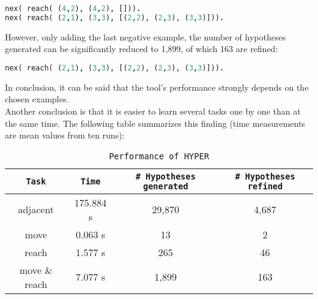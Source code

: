 \begin{lstlisting}[label={lst:comb_neg2}, language=Prolog, caption=Additional example for combined learning of "move" \& "reach", belowcaptionskip=1cm]
nex( reach( (4,2), (4,2), [])).
nex( reach( (2,1), (3,3), [(2,2), (2,3), (3,3)])).
\end{lstlisting}
However, only adding the last negative example, the number of hypotheses generated can be significantly reduced to 1,899, of which 163 are refined:
\begin{lstlisting}[label={lst:comb_neg3}, language=Prolog, caption=Additional example for combined learning of "move" \& "reach", belowcaptionskip=1cm]
nex( reach( (2,1), (3,3), [(2,2), (2,3), (3,3)])).
\end{lstlisting}
In conclusion, it can be said that the tool's performance strongly depends on the chosen examples.\\
Another conclusion is that it is easier to learn several tasks one by one than at the same time. 
The following table summarizes this finding (time measurements are mean values from ten runs):
{
\begin{center}
    \begin{table}[h]
    \centering
    \begin{tabular}{ |c|c|c|c|} 
        \hline
        \texttt{Task} & \texttt{Time} & \texttt{\# Hypotheses generated} & \texttt{\# Hypotheses refined} \\ \hline
        adjacent & 175.884 s & 29,870 & 4,687 \\ 
        move & 0.063 s & 13 & 2\\
        reach & 1.577 s & 265 & 46\\
        move \& reach & 7.077 s & 1,899 & 163\\
        \hline
    \end{tabular}
    \caption{\label{tab:hyper_res}\texttt{Performance of HYPER}}
    \end{table}
\end{center}
}



